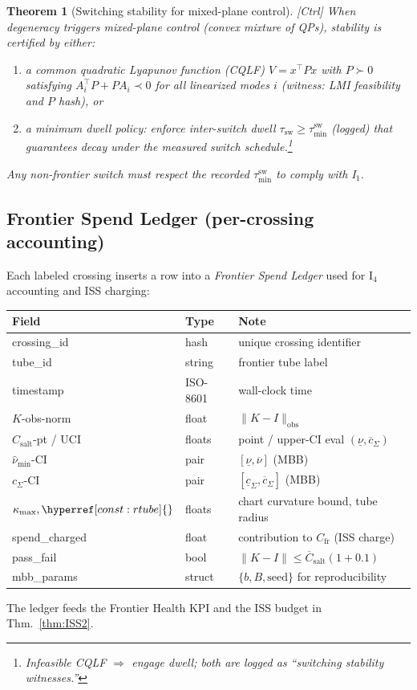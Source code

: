 \documentclass[10pt]{article}
\newcommand{\layertag}[1]{\textup{[#1]}}
\newcommand{\constref}[1]{\hyperref[const:#1]{\ensuremath{\csname constsym#1\endcsname}}}
\newtheorem{theorem}{Theorem}
\begin{document}
\begin{theorem}[Switching stability for mixed-plane control]\label{thm:switching}
\emph{\layertag{Ctrl}}
When degeneracy triggers mixed-plane control (convex mixture of QPs), stability is certified by either:
\begin{enumerate}[leftmargin=*,itemsep=2pt]
\item a \emph{common quadratic Lyapunov function (CQLF)} $V=x^\top P x$ with $P\succ0$ satisfying $A_i^\top P+P A_i\prec 0$ for all linearized modes $i$ (witness: LMI feasibility and $P$ hash), or
\item a \emph{minimum dwell} policy: enforce inter-switch dwell $\tau_{\mathrm{sw}}\ge \tau_{\min}^{\mathrm{sw}}$ (logged) that guarantees decay under the measured switch schedule.\footnote{Infeasible CQLF $\Rightarrow$ engage dwell; both are logged as “switching stability witnesses.”}
\end{enumerate}
Any non-frontier switch must respect the recorded $\tau_{\min}^{\mathrm{sw}}$ to comply with I$_1$.
\end{theorem}

\subsection*{Frontier Spend Ledger (per-crossing accounting)}\label{subsec:frontier-ledger}
\noindent
Each labeled crossing inserts a row into a \emph{Frontier Spend Ledger} used for I$_4$ accounting and ISS charging:
\begin{center}
\renewcommand{\arraystretch}{1.06}
\begin{tabularx}{\textwidth}{@{} l l X @{}}
\toprule
\textbf{Field} & \textbf{Type} & \textbf{Note} \\
\midrule
crossing\_id & hash & unique crossing identifier \\
tube\_id & string & frontier tube label \\
timestamp & ISO-8601 & wall-clock time \\
$K$-obs-norm & float & $\|K{-}I\|_{\text{obs}}$ \\
$C_{\mathrm{salt}}$-pt / UCI & floats & point / upper-CI eval $(\underline\nu,\overline c_\Sigma)$ \\
$\hat\nu_{\min}$-CI & pair & $[\underline\nu,\overline\nu]$ (MBB) \\
$c_\Sigma$-CI & pair & $[\underline c_\Sigma,\overline c_\Sigma]$ (MBB) \\
$\kappa_{\max},\constref{rtube}$ & floats & chart curvature bound, tube radius \\
spend\_charged & float & contribution to $C_{\mathrm{fr}}$ (ISS charge) \\
pass\_fail & bool & $\|K{-}I\|\le \overline C_{\mathrm{salt}}(1{+}0.1)$ \\
mbb\_params & struct & $\{b,B,\text{seed}\}$ for reproducibility \\
\bottomrule
\end{tabularx}
\end{center}
The ledger feeds the Frontier Health KPI and the ISS budget in Thm.~\ref{thm:ISS2}.
\end{document}
